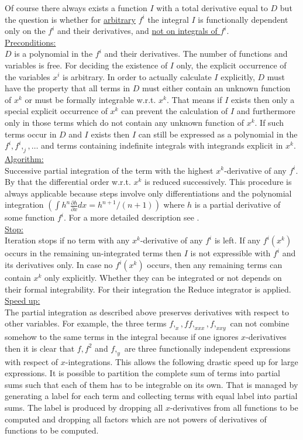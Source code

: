 \documentclass[12pt]{article}
\begin{document}
Of course there
always exists a function $I$ with a total derivative equal to $D$ but
the question is whether for \underline{arbitrary} $f^i$ the integral
$I$ is functionally dependent only on the $f^i$ and their derivatives,
and \underline{not on integrals of $f^i.$} \\
\underline{Preconditions:} \\
$D$ is a polynomial in the $f^i$ and their derivatives. The number of
functions and variables is free.
For deciding the existence of $I$ only, the explicit occurrence of the
variables $x^i$ is arbitrary. In order to actually
calculate $I$ explicitly, $D$ must have the property that all terms in $D$
must either contain an unknown function of $x^k$ or
must be formally integrable w.r.t. $x^k.$
That means if $I$ exists then
only a special explicit occurrence of $x^k$ can prevent the
calculation of $I$
and furthermore only in those terms which do not contain
any unknown function of $x^k.$
If such terms occur in $D$ and $I$ exists then $I$ can still be expressed
as a polynomial in the $f^i, f^i,_j, \ldots$ and terms containing
indefinite integrals with integrands explicit in $x^k.$ \\
\underline{Algorithm:} \\
Successive partial integration of the term with the highest
$x^k$-derivative of any $f^i.$ By that the
differential order w.r.t. $x^k$ is reduced
successively. This procedure is always applicable because steps involve only
differentiations and the polynomial
integration $(\int h^n\frac{\partial h}{\partial x}dx =
h^{n+1}/(n+1))$ where $h$ is a partial derivative of some function
$f^i.$ For a more detailed description see \cite{Wol99e}.\\
\underline{Stop:} \\
Iteration stops if no term with any $x^k$-derivative of any $f^i$ is left.
If any $f^i(x^k)$ occurs in the remaining un-integrated terms
then $I$ is not expressible with $f^i$ and its derivatives only. In
case no $f^i(x^k)$ occurs, then any remaining terms can contain $x^k$ only
explicitly. Whether they can be integrated or not depends on their formal
integrability. For their integration the {\sc Reduce} integrator is
applied. \\
\underline{Speed up:} \\
The partial integration as described above preserves derivatives with
respect to other variables. For example, the three terms $f,_x, f
f,_{xxx}, f,_{xxy}$ can not combine somehow to the same terms in the
integral because if one ignores $x$-derivatives then it is clear that
$f, f^2$ and $f,_y$ are three functionally independent expressions
with respect of $x$-integrations. This allows the following drastic speed up
for large expressions. It is possible to partition the complete sum of
terms into partial sums such that each of them has to be
integrable on its own. That is managed by generating a label for each
term and collecting terms with equal label into partial sums. The
label is produced by dropping all $x$-derivatives from all functions
to be computed and dropping all factors which are not powers of derivatives of
functions to be computed.
\end{document}
